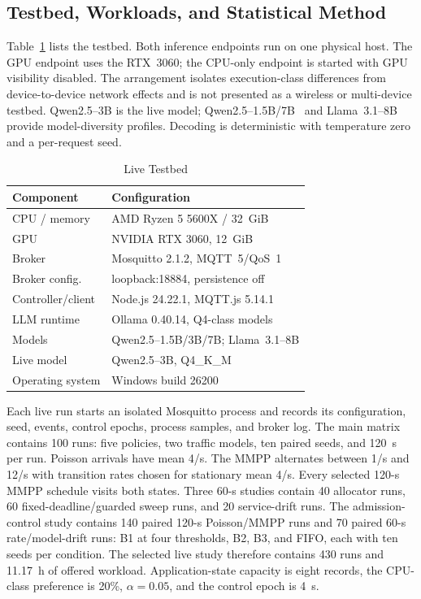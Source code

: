 \documentclass[journal]{IEEEtran}
\begin{document}
\subsection{Testbed, Workloads, and Statistical Method}

Table~\ref{tab:testbed} lists the testbed. Both inference endpoints run on one physical host. The GPU endpoint uses the RTX~3060; the CPU-only endpoint is started with GPU visibility disabled. The arrangement isolates execution-class differences from device-to-device network effects and is not presented as a wireless or multi-device testbed. Qwen2.5--3B is the live model; Qwen2.5--1.5B/7B~\cite{qwen2025qwen25} and Llama~3.1--8B~\cite{grattafiori2024llama3} provide model-diversity profiles. Decoding is deterministic with temperature zero and a per-request seed.

\begin{table}[t]
\centering
\caption{Live Testbed}
\label{tab:testbed}
\small
\begin{tabular}{@{}ll@{}}
\toprule
Component & Configuration \\
\midrule
CPU / memory & AMD Ryzen 5 5600X / 32~GiB \\
GPU & NVIDIA RTX 3060, 12~GiB \\
Broker & Mosquitto 2.1.2, MQTT~5/QoS~1 \\
Broker config. & loopback:18884, persistence off \\
Controller/client & Node.js 24.22.1, MQTT.js 5.14.1 \\
LLM runtime & Ollama 0.40.14, Q4-class models \\
Models & Qwen2.5--1.5B/3B/7B; Llama~3.1--8B \\
Live model & Qwen2.5--3B, Q4\_K\_M \\
Operating system & Windows build 26200 \\
\bottomrule
\end{tabular}
\end{table}

Each live run starts an isolated Mosquitto process and records its configuration, seed, events, control epochs, process samples, and broker log. The main matrix contains 100 runs: five policies, two traffic models, ten paired seeds, and 120~s per run. Poisson arrivals have mean 4/s. The MMPP alternates between 1/s and 12/s with transition rates chosen for stationary mean 4/s. Every selected 120-s MMPP schedule visits both states. Three 60-s studies contain 40 allocator runs, 60 fixed-deadline/guarded sweep runs, and 20 service-drift runs. The admission-control study contains 140 paired 120-s Poisson/MMPP runs and 70 paired 60-s rate/model-drift runs: B1 at four thresholds, B2, B3, and FIFO, each with ten seeds per condition. The selected live study therefore contains 430 runs and 11.17~h of offered workload. Application-state capacity is eight records, the CPU-class preference is 20\%, $\alpha=0.05$, and the control epoch is 4~s.
\end{document}
